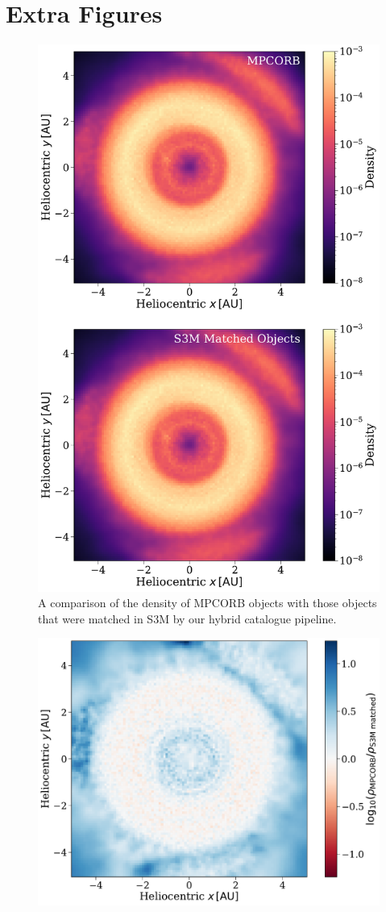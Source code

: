 \documentclass[twocolumn, twocolappendix]{aastex631}
\newcommand{\sss}{S3M}
\newcommand{\mpco}{MPCORB}
\begin{document}
\section{Extra Figures}\label{app:extra_figs}
\begin{figure}[htb]
    \centering
    \includegraphics[width=\columnwidth]{density_comparisons.pdf}
    \caption{A comparison of the density of \mpco{} objects with those objects that were matched in \sss{} by our hybrid catalogue pipeline.}
    \label{fig:density_compare}
\end{figure}
\begin{figure}[htb]
    \centering
    \includegraphics[width=\columnwidth]{density_residuals.pdf}
    \caption{}
    \label{fig:density_residuals}
\end{figure}
\end{document}
